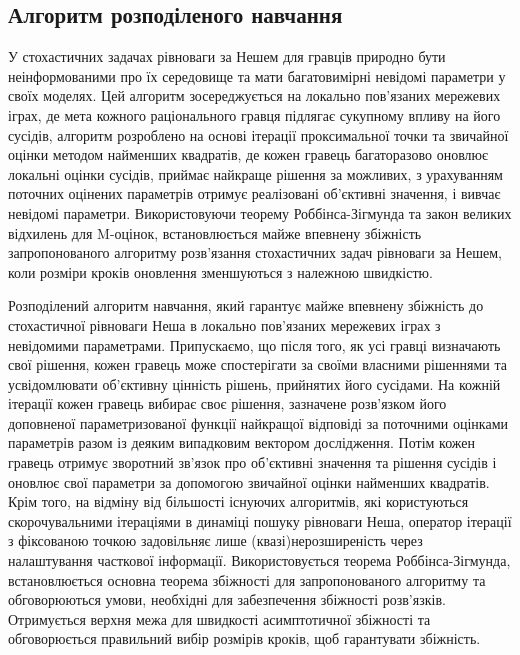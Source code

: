 \documentclass[a4paper]{article}
\begin{document}
\subsection{Алгоритм розподіленого навчання \cite{Article3}}\label{alg3}
У стохастичних задачах рівноваги за Нешем для гравців природно бути неінформованими про їх середовище та мати багатовимірні невідомі параметри у своїх моделях. Цей алгоритм зосереджується на локально пов'язаних мережевих іграх, де мета кожного раціонального гравця підлягає сукупному впливу на його сусідів, алгоритм розроблено на основі ітерації проксимальної точки та звичайної оцінки методом найменших квадратів, де кожен гравець багаторазово оновлює локальні оцінки сусідів, приймає найкраще рішення за можливих, з урахуванням поточних оцінених параметрів отримує реалізовані об'єктивні значення, і вивчає невідомі параметри. Використовуючи теорему Роббінса-Зігмунда та закон великих відхилень для M-оцінок, встановлюється майже впевнену збіжність
запропонованого алгоритму розв'язання стохастичних задач рівноваги за Нешем, коли розміри кроків оновлення зменшуються з належною швидкістю.

Розподілений алгоритм навчання, який гарантує майже впевнену збіжність до стохастичної рівноваги Неша в локально пов’язаних мережевих іграх з невідомими параметрами. Припускаємо, що після того, як усі гравці визначають свої рішення, кожен гравець може спостерігати за своїми власними рішеннями та усвідомлювати об'єктивну цінність рішень, прийнятих його сусідами. На кожній ітерації кожен гравець вибирає своє рішення, зазначене розв’язком його доповненої параметризованої функції найкращої відповіді за поточними оцінками параметрів разом із деяким випадковим вектором дослідження. Потім кожен гравець отримує зворотний зв’язок про об’єктивні значення та рішення сусідів і оновлює свої параметри за допомогою звичайної оцінки найменших квадратів. Крім того, на відміну від більшості існуючих алгоритмів, які користуються скорочувальними ітераціями в динаміці пошуку рівноваги Неша, оператор ітерації з фіксованою точкою задовільняє лише (квазі)нерозширеність через налаштування часткової інформації. Використовується теорема Роббінса-Зігмунда, встановлюється основна теорема збіжності для запропонованого алгоритму та обговорюються умови, необхідні для забезпечення збіжності розв'язків. Отримується верхня межа для швидкості асимптотичної збіжності та обговорюється правильний вибір розмірів кроків, щоб гарантувати збіжність.
\end{document}
